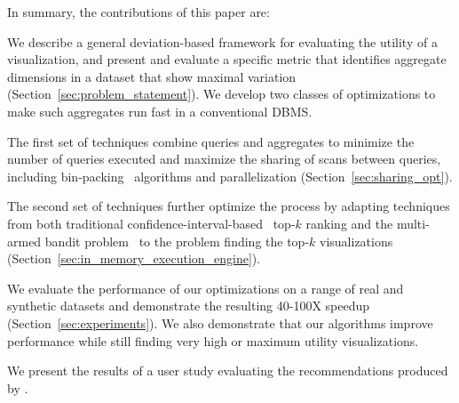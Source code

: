 In summary, the contributions of this paper are:
\begin{denselist}
\item We describe a general deviation-based framework 
for evaluating the utility  of a visualization,
and present and evaluate a specific metric that identifies 
aggregate dimensions in a dataset that
show maximal variation (Section~\ref{sec:problem_statement}).
We develop two classes of optimizations to make such aggregates run fast 
in a conventional DBMS.
  \item The first set of techniques
  combine queries and aggregates to minimize the number of queries executed and 
  maximize the sharing of scans between queries, 
  including bin-packing~\cite{garey} algorithms and parallelization
  (Section~\ref{sec:sharing_opt}).
  \item The second set of techniques further optimize the process by adapting techniques 
  from both traditional confidence-interval-based~\cite{hoeffding1963probability} top-$k$ ranking and the
   multi-armed bandit problem~\cite{bandits} 
   to the problem finding the top-$k$ visualizations (Section~\ref{sec:in_memory_execution_engine}).
  \item We evaluate the performance of our optimizations on a range of
  real and synthetic datasets and demonstrate the resulting 40-100X speedup 
  (Section~\ref{sec:experiments}). We also demonstrate that our algorithms
  improve performance while still finding very high or maximum utility visualizations.
  \item We present the results of a user study evaluating the recommendations produced by \SeeDB.
\end{denselist}




